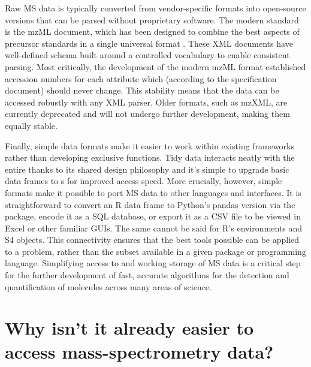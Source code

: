 Raw MS data is typically converted from vendor-specific formats into open-source versions that can be parsed without proprietary software. The modern standard is the mzML document, which has been designed to combine the best aspects of precursor standards in a single universal format \citep{deutsch2010}. These XML documents have well-defined schema built around a controlled vocabulary to enable consistent parsing. Most critically, the development of the modern mzML format established accession numbers for each attribute which (according to the specification document) should never change. This stability means that the data can be accessed robustly with any XML parser. Older formats, such as mzXML, are currently deprecated and will not undergo further development, making them equally stable.

Finally, simple data formats make it easier to work within existing frameworks rather than developing exclusive functions. Tidy data interacts neatly with the entire  thanks to its shared design philosophy and it's simple to upgrade basic data frames to s for improved access speed. More crucially, however, simple formats make it possible to port MS data to other languages and interfaces. It is straightforward to convert an R data frame to Python's pandas version via the  package, encode it as a SQL database, or export it as a CSV file to be viewed in Excel or other familiar GUIs. The same cannot be said for R's environments and S4 objects. This connectivity ensures that the best tools possible can be applied to a problem, rather than the subset available in a given package or programming language. Simplifying access to and working storage of MS data is a critical step for the further development of fast, accurate algorithms for the detection and quantification of molecules across many areas of science.

\section{Why isn't it already easier to access mass-spectrometry data?}

